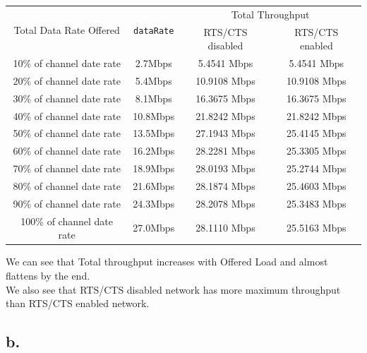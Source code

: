 \documentclass[11pt, fleqn]{article}
\begin{document}
\begin{table}[H]
    \centering
    \begin{tabular}{||c|c||c|c||}
         \hline
         \multirow{2}{*}{Total Data Rate Offered} & \multirow{2}{*}{\texttt{dataRate}} & \multicolumn{2}{c||}{Total Throughput} \\
         & & RTS/CTS disabled & RTS/CTS enabled \\
         \hline %
         10\% of channel date rate & 2.7Mbps & 5.4541 Mbps & 5.4541 Mbps \\
         \hline %
         20\% of channel date rate & 5.4Mbps & 10.9108 Mbps & 10.9108 Mbps \\
         \hline %
         30\% of channel date rate & 8.1Mbps & 16.3675 Mbps & 16.3675 Mbps \\
         \hline %
         40\% of channel date rate & 10.8Mbps & 21.8242 Mbps & 21.8242 Mbps \\
         \hline %
         50\% of channel date rate & 13.5Mbps & 27.1943 Mbps & 25.4145 Mbps \\
         \hline %
         60\% of channel date rate & 16.2Mbps & 28.2281 Mbps & 25.3305 Mbps \\
         \hline %
         70\% of channel date rate & 18.9Mbps & 28.0193 Mbps & 25.2744 Mbps \\
         \hline %
         80\% of channel date rate & 21.6Mbps & 28.1874 Mbps & 25.4603 Mbps \\
         \hline %
         90\% of channel date rate & 24.3Mbps & 28.2078 Mbps & 25.3483 Mbps \\
         \hline %
         100\% of channel date rate & 27.0Mbps & 28.1110 Mbps & 25.5163 Mbps \\
         \hline         
    \end{tabular}
\end{table}

We can see that Total throughput increases with Offered Load and almost flattens by the end. \\
We also see that RTS/CTS disabled network has more maximum throughput than RTS/CTS enabled network.

\subsection*{b.}
\end{document}
